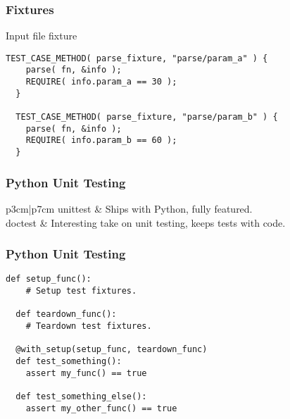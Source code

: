 \begin{frame}[fragile]
  \frametitle{Fixtures}
  \begin{block}{Input file fixture}
    \begin{lstlisting}[style=C]
  TEST_CASE_METHOD( parse_fixture, "parse/param_a" ) {
    parse( fn, &info );
    REQUIRE( info.param_a == 30 );
  }

  TEST_CASE_METHOD( parse_fixture, "parse/param_b" ) {
    parse( fn, &info );
    REQUIRE( info.param_b == 60 );
  }
    \end{lstlisting}
  \end{block}
\end{frame}

\begin{frame}
  \frametitle{Python Unit Testing}
  \begin{tabular}{p{3cm}|p{7cm}}
    {\color{Base09}unittest} & Ships with Python, fully featured. \vspace{0.1cm} \\
    \hline
    {\color{Base09}doctest} & Interesting take on unit testing, keeps tests with code. \vspace{0.1cm} \\
    \hline
  \end{tabular}
\end{frame}

\begin{frame}[fragile]
  \frametitle{Python Unit Testing}
  \begin{example}
    \begin{lstlisting}[style=Py]
  def setup_func():
    # Setup test fixtures.

  def teardown_func():
    # Teardown test fixtures.

  @with_setup(setup_func, teardown_func)
  def test_something():
    assert my_func() == true

  def test_something_else():
    assert my_other_func() == true
    \end{lstlisting}
  \end{example}
\end{frame}


